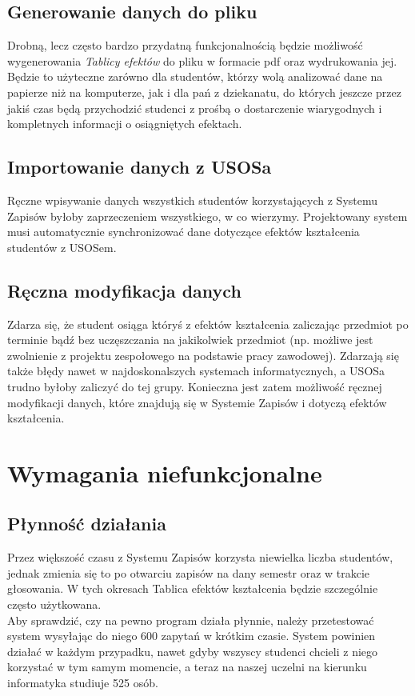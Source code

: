 \documentclass{article}
\begin{document}
\subsection{Generowanie danych do pliku}
Drobną, lecz często bardzo przydatną funkcjonalnością będzie możliwość wygenerowania \textit{Tablicy efektów} do pliku w formacie pdf oraz wydrukowania jej.
Będzie to użyteczne zarówno dla studentów, którzy wolą analizować dane na papierze niż na komputerze, jak i dla pań z dziekanatu, do których jeszcze przez jakiś czas będą przychodzić studenci z prośbą o dostarczenie
wiarygodnych i kompletnych informacji o osiągniętych efektach.

\subsection{Importowanie danych z USOSa}
Ręczne wpisywanie danych wszystkich studentów korzystających z Systemu Zapisów byłoby zaprzeczeniem wszystkiego, w co wierzymy. Projektowany system musi automatycznie synchronizować dane dotyczące efektów kształcenia studentów z USOSem.


\subsection{Ręczna modyfikacja danych}
Zdarza się, że student osiąga któryś z efektów kształcenia zaliczając przedmiot po terminie bądź bez uczęszczania na jakikolwiek przedmiot (np. możliwe jest zwolnienie z projektu zespołowego na podstawie pracy zawodowej). Zdarzają się także błędy nawet w najdoskonalszych systemach informatycznych, a USOSa trudno byłoby zaliczyć do tej grupy. Konieczna jest zatem możliwość ręcznej modyfikacji danych, które znajdują się w Systemie Zapisów i dotyczą efektów kształcenia.



\section{Wymagania niefunkcjonalne}

\subsection{Płynność działania}
Przez większość czasu z Systemu Zapisów korzysta niewielka liczba studentów, jednak zmienia się to po otwarciu zapisów na dany semestr oraz w trakcie głosowania. W tych okresach Tablica efektów kształcenia będzie szczególnie często użytkowana.
\\ Aby sprawdzić, czy na pewno program działa płynnie, należy przetestować system wysyłając do niego 600 zapytań w krótkim czasie. System powinien działać w każdym przypadku, nawet gdyby wszyscy studenci chcieli z niego korzystać w tym samym momencie, a teraz 
na naszej uczelni na kierunku informatyka studiuje 525 osób.
\end{document}

